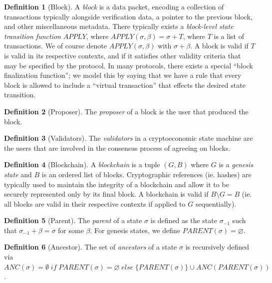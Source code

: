 \documentclass[11pt,a4paper]{report}
\theoremstyle{plain}
\theoremstyle{definition}
\newtheorem{defn}{Definition}[chapter]
\theoremstyle{remark}
\begin{document}
\begin{defn}[Block]
A \emph{block} is a data packet, encoding a collection of transactions typically alongside verification data, a pointer to the previous block, and other miscellaneous metadata. There typically exists a \emph{block-level state transition function} $APPLY$, where $APPLY(\sigma, \beta) = \sigma + T$, where $T$ is a list of transactions. We of course denote $APPLY(\sigma, \beta)$ with $\sigma + \beta$. A block is valid if $T$ is valid in its respective contexts, and if it satisfies other validity criteria that may be specified by the protocol. In many protocols, there exists a special ``block finalization function''; we model this by saying that we have a rule that every block is allowed to include a ``virtual transaction'' that effects the desired state transition.
\end{defn}

\begin{defn}[Proposer]
The \emph{proposer} of a block is the user that produced the block.
\end{defn}

\begin{defn}[Validators]
The \emph{validators} in a cryptoeconomic state machine are the users that are involved in the consensus process of agreeing on blocks.
\end{defn}

\begin{defn}[Blockchain]
A \emph{blockchain} is a tuple $(G, B)$ where $G$ is a \emph{genesis state} and $B$ is an ordered list of blocks. Cryptographic references (ie. hashes) are typically used to maintain the integrity of a blockchain and allow it to be securely represented only by its final block. A blockchain is valid if $B \setminus G = B$ (ie. all blocks are valid in their respective contexts if applied to $G$ sequentially). 
\end{defn}

\begin{defn}[Parent]
The \emph{parent} of a state $\sigma$ is defined as the state $\sigma_{-1}$ such that $\sigma_{-1} + \beta = \sigma$ for some $\beta$. For genesis states, we define $PARENT(\sigma) = \varnothing$.
\end{defn}

\begin{defn}[Ancestor]
The set of \emph{ancestors} of a state $\sigma$ is recursively defined via $ANC(\sigma) = \emptyset \; if \; PARENT(\sigma) = \varnothing \; else \; \{PARENT(\sigma)\} \cup ANC(PARENT(\sigma))$.
\end{defn}
\end{document}
